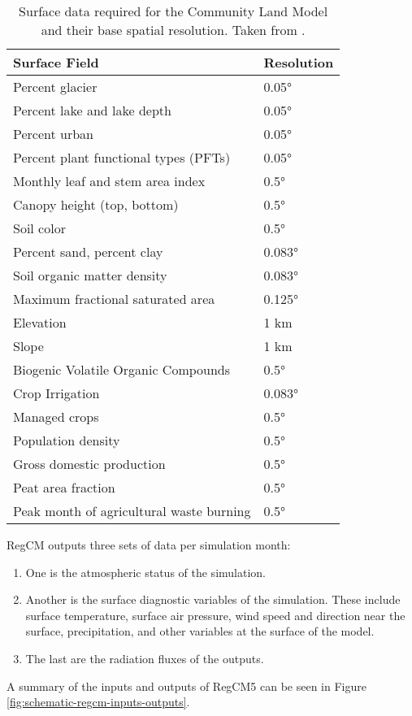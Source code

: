 		\begin{table}[]
			\caption{
				Surface data required for the Community Land Model and their base spatial resolution.
				Taken from \textcite{Oleson2013}.
			}
			\label{tab:surface-data-clm}
			\centering
			\begin{tabular}{ll}
				\hline \hline
				Surface Field & Resolution                      \\
				\hline
				Percent glacier & 0.05°                         \\
				Percent lake and lake depth & 0.05°             \\
				Percent urban & 0.05°                           \\
				Percent plant functional types (PFTs) & 0.05°   \\
				Monthly leaf and stem area index & 0.5°         \\
				Canopy height (top, bottom) & 0.5°              \\
				Soil color & 0.5°                               \\
				Percent sand, percent clay & 0.083°                           \\
				Soil organic matter density & 0.083°            \\
				Maximum fractional saturated area & 0.125°      \\
				Elevation & 1 km                                 \\
				Slope & 1 km                                     \\
				Biogenic Volatile Organic Compounds & 0.5°      \\
				Crop Irrigation & 0.083°                        \\
				Managed crops & 0.5°                            \\
				Population density & 0.5°                       \\
				Gross domestic production & 0.5°                \\
				Peat area fraction & 0.5°                       \\
				Peak month of agricultural waste burning & 0.5° \\
				\hline
			\end{tabular}
		\end{table}
	
		RegCM outputs three sets of data per simulation month:
		\begin{enumerate}
			\item One is the atmospheric status of the simulation.
			\item Another is the surface diagnostic variables of the simulation.
				These include surface temperature, surface air pressure, wind speed and direction near the surface, precipitation, and other variables at the surface of the model.
			\item The last are the radiation fluxes of the outputs.
		\end{enumerate}
		A summary of the inputs and outputs of RegCM5 can be seen in Figure \ref{fig:schematic-regcm-inputs-outputs}.
	

